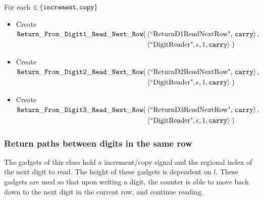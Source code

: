         \noindent For each {\inc} $\in \{ {\tt increment, copy } \}$

        \begin{itemize}
            \item Create
            $\begin{aligned}[t]
                {\tt Return\_From\_Digit1\_Read\_Next\_Row}(& \left \langle \text{``ReturnD1ReadNextRow", {\tt carry}}       \right\rangle, & \\
                                           & \left \langle \text{``DigitReader"}, \epsilon, 1, {\tt carry} \right\rangle \;)
            \end{aligned}$

            \item Create
            $\begin{aligned}[t]
                {\tt Return\_From\_Digit2\_Read\_Next\_Row}(& \left \langle \text{``ReturnD2ReadNextRow", {\tt carry}}      \right\rangle, & \\
                                           & \left \langle \text{``DigitReader"}, \epsilon, 1, {\tt carry} \right\rangle \;)
            \end{aligned}$

            \item Create
            $\begin{aligned}[t]
                {\tt Return\_From\_Digit3\_Read\_Next\_Row}(& \left \langle \text{``ReturnD3ReadNextRow", {\tt carry}}      \right\rangle, & \\
                                             & \left \langle \text{``DigitReader"}, \epsilon, 1, {\tt carry} \right\rangle \;)
            \end{aligned}$
        \end{itemize}
    \vspace{1cm}



    \subsubsection{Return paths between digits in the same row}
        The gadgets of this class hold a increment/copy signal and the regional index
        of the next digit to read. The height of these gadgets is dependent on $l$.
        These gadgets are used so that upon writing a digit, the counter
        is able to move back down to the next digit in the current row, and continue
        reading.
        \vspace{1cm}

